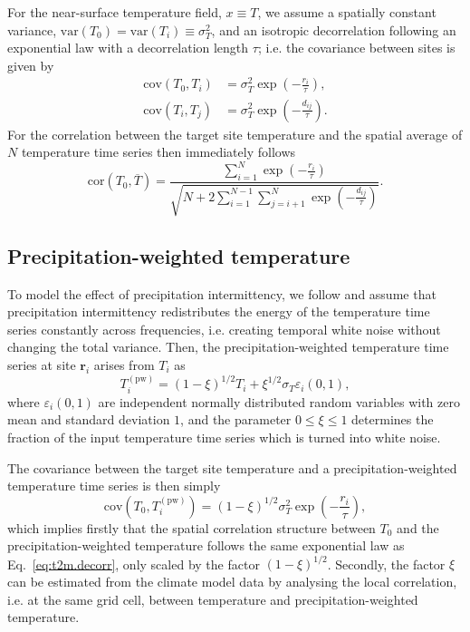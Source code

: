 \documentclass[cp, manuscript]{copernicus}
\begin{document}
For the near-surface temperature field, $x \equiv T$, we assume a spatially
constant variance, $\mathrm{var}(T_0)=\mathrm{var}(T_i)\equiv\sigma_T^2$, and an
isotropic decorrelation following an exponential law with a decorrelation length
$\tau$; i.e. the covariance between sites is given by
%
\begin{align}
\label{eq:t2m.decorr}
\mathrm{cov}(T_0,T_i)&=\sigma_T^2\exp{\left(-\frac{r_i}{\tau}\right)},\\
\mathrm{cov}(T_i,T_j)&=\sigma_T^2\exp{\left(-\frac{d_{ij}}{\tau}\right)}.
\end{align}
%
For the correlation between the target site temperature and the spatial average
of $N$ temperature time series then immediately follows
%
\begin{equation}
\label{eq:t2m.corr}
\mathrm{cor}(T_0,\overline{T})=
\frac{\sum_{i=1}^{N}\exp{\left(-\frac{r_i}{\tau}\right)}}
{\sqrt{N+2\sum_{i=1}^{N-1}
\sum_{j=i+1}^{N}{\exp{\left(-\frac{d_{ij}}{\tau}\right)}}}}.
\end{equation}

\subsection{Precipitation-weighted temperature}
\label{app:concept.model.t2m.pw}

To model the effect of precipitation intermittency, we follow
\citet{Laepple2018} and assume that precipitation intermittency redistributes
the energy of the temperature time series constantly across frequencies,
i.e. creating temporal white noise without changing the total variance. Then,
the precipitation-weighted temperature time series at site $\mathbf{r}_i$ arises
from $T_i$ as
%
\begin{equation}
\label{eq:precip.weighting}
T_i^{\mathrm{(pw)}}=
\left(1-\xi\right)^{1/2}T_i + \xi^{1/2} \sigma_T \varepsilon_i(0,1),
\end{equation}
%
where $\varepsilon_i(0,1)$ are independent normally distributed random variables
with zero mean and standard deviation $1$, and the parameter $0\leq\xi\leq1$
determines the fraction of the input temperature time series which is turned
into white noise.

The covariance between the target site temperature and a precipitation-weighted
temperature time series is then simply
\begin{equation}
\label{eq:t2m.pw.decorr}
\mathrm{cov}(T_0,T_i^{\mathrm{(pw)}})=
(1-\xi)^{1/2}\sigma_T^2\exp{\left(-\frac{r_i}{\tau}\right)},
\end{equation}
%
which implies firstly that the spatial correlation structure between $T_0$ and
the precipitation-weighted temperature follows the same exponential law as
Eq.~\eqref{eq:t2m.decorr}, only scaled by the factor $(1-\xi)^{1/2}$. Secondly,
the factor $\xi$ can be estimated from the climate model data by analysing the
local correlation, i.e. at the same grid cell, between temperature and
precipitation-weighted temperature.
\end{document}

